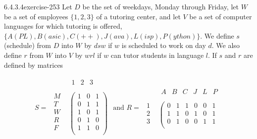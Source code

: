 \documentclass[twoside,10pt,]{book}
\numberwithin{equation}{section}
\begin{document}
\begin{divisionsolution}{6.4.3.4}{}{exercise-253}%
\hypertarget{p-2152}{}%
Let \(D\) be the set of weekdays, Monday through Friday, let \(W\) be a set of employees \(\{1, 2, 3\}\) of a tutoring center, and let \(V\) be a set of computer languages for which tutoring is offered,  \(\{A(PL), B(asic), C(++), J(ava), L(isp), P(ython)\}\). We define \(s\) (schedule) from \(D\) into \(W\) by \(d s w\) if \(w\) is scheduled to work on day \(d\). We also define \(r\) from \(W\) into \(V\) by \(w r l\) if \(w\) can tutor students in language \(l\). If \(s\) and \(r\) are defined by matrices%
\par
\hypertarget{p-2153}{}%
%
\begin{equation*}
S = 
\begin{array}{cc}
& 
\begin{array}{ccc}
1 & 2 & 3 \\
\end{array}
\\
\begin{array}{c}
M \\
T \\
W \\
R \\
F \\
\end{array}
& 
\left(
\begin{array}{ccc}
1 & 0 & 1 \\
0 & 1 & 1 \\
1 & 0 & 1 \\
0 & 1 & 0 \\
1 & 1 & 0 \\
\end{array}
\right) \\
\end{array}
\textrm{ and }R=
\begin{array}{cc}
& 
\begin{array}{cccccc}
A & B & C & J & L & P \\
\end{array}
\\
\begin{array}{c}
1 \\
2 \\
3 \\
\end{array}
& \left(
\begin{array}{cccccc}
0 & 1 & 1 & 0 & 0 & 1 \\
1 & 1 & 0 & 1 & 0 & 1 \\
0 & 1 & 0 & 0 & 1 & 1 \\

\end{array}
\end{array}
\end{equation*}
\end{divisionsolution}
\end{document}
